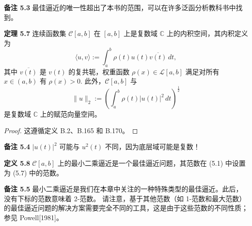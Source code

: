 \documentclass[a4paper]{ctexart}
\newcommand{\hl}[1]
{\noindent {\bf {#1}}}
\begin{document}
{\noindent \textbf{备注 5.3} 最佳逼近的唯一性超出了本书的范围，可以在许多泛函分析教科书中找到。

\noindent \textbf{定理 5.7} 连续函数集 \( \mathcal{C}[a, b] \) 在 \( [a, b] \) 上是复数域 \( \mathbb{C} \) 上的内积空间，其内积定义为
\[
  \langle u, v \rangle := \int_a^b \rho(t) u(t) \overline{v(t)} \, dt, \tag{5.6}
\]
其中 \( \overline{v(t)} \) 是 \( v(t) \) 的复共轭，权重函数 \( \rho(x) \in \mathcal{L}[a, b] \) 满足对所有 \( x \in (a, b) \) 有 \( \rho(x) > 0 \). 
此外，\( \mathcal{C}[a, b] \) 与
\[
  \|u\|_2 := \left( \int_a^b \rho(t) |u(t)|^2 \, dt \right)^{\frac{1}{2}} \tag{5.7}
\]
是复数域 \( \mathbb{C} \) 上的赋范向量空间。

\begin{proof}
这遵循定义 B.2、B.165 和 B.170。
\end{proof}

\noindent \textbf{备注 5.4} \( |u(t)|^2 \) 可能与 \( u^2(t) \) 不同，因为底层域可能是复数！

\noindent \textbf{定义 5.8} \( \mathcal{C}[a, b] \) 上的最小二乘逼近是一个最佳逼近问题，其范数在 (5.1) 中设置为 (5.7) 中的范数。

\noindent \textbf{备注 5.5} 最小二乘逼近是我们在本章中关注的一种特殊类型的最佳逼近。此后，没有下标的范数意味着 2-范数。
请注意，基于其他范数（如 1-范数和最大范数）的最佳逼近问题的解决方案需要完全不同的工具，这是由于这些范数的不同性质；参见 Powell[1981]。





}
\end{document}
